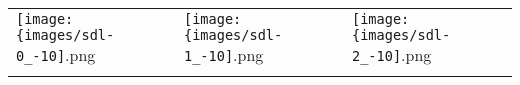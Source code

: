  \begin{tabular}{lll}
\texttt{[image: \{images/sdl-0\_-10]}.png} &\texttt{[image: \{images/sdl-1\_-10]}.png} &\texttt{[image: \{images/sdl-2\_-10]}.png} 
 \\ \hfill\end{tabular}
